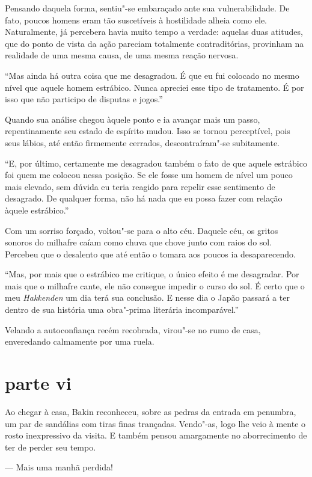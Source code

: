 Pensando daquela forma, sentiu"-se embaraçado ante sua vulnerabilidade.
De fato, poucos homens eram tão suscetíveis à hostilidade alheia como
ele. Naturalmente, já percebera havia muito tempo a verdade: aquelas
duas atitudes, que do ponto de vista da ação pareciam totalmente
contraditórias, provinham na realidade de uma mesma causa, de uma mesma 
reação nervosa.

``Mas ainda há outra coisa que me desagradou. É que eu fui colocado no
mesmo nível que aquele homem estrábico. Nunca apreciei esse tipo de
tratamento. É por isso que não participo de disputas e jogos.''

Quando sua análise chegou àquele ponto e ia avançar mais um passo,
repentinamente seu estado de espírito mudou. Isso se tornou
perceptível, pois seus lábios, até então firmemente cerrados,
descontraíram"-se subitamente.

``E, por último, certamente me desagradou também o fato de que aquele
estrábico foi quem me colocou nessa posição. Se ele fosse um homem de
nível um pouco mais elevado, sem dúvida eu teria reagido para repelir
esse sentimento de desagrado. De qualquer forma, não há nada que eu
possa fazer com relação àquele estrábico.''

Com um sorriso forçado, voltou"-se para o alto céu. Daquele céu, os
gritos sonoros do milhafre caíam como chuva que chove junto com raios
do sol. Percebeu que o desalento que até então o tomara aos poucos ia
desaparecendo.

``Mas, por mais que o estrábico me critique, o único efeito é me
desagradar. Por mais que o milhafre cante, ele não consegue impedir o
curso do sol. É certo que o meu \textit{Hakkenden} um dia terá sua
conclusão. E nesse dia o Japão passará a ter dentro de sua história uma
obra"-prima literária incomparável.''

Velando a autoconfiança recém recobrada, virou"-se no rumo de casa,
enveredando calmamente por uma ruela.

\section*{parte vi}

Ao chegar à casa, Bakin reconheceu, sobre as pedras da entrada em
penumbra, um par de sandálias com tiras finas trançadas. Vendo"-as, logo
lhe veio à mente o rosto inexpressivo da visita. E também pensou
amargamente no aborrecimento de ter de perder seu tempo.

--- Mais uma manhã perdida!

